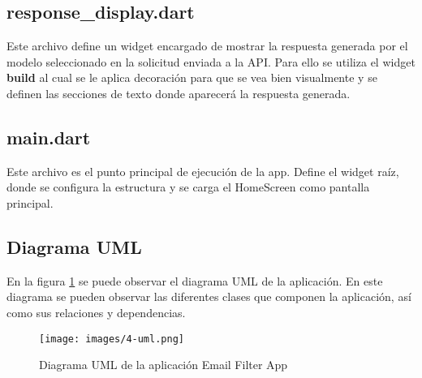 \documentclass[12pt]{article}
\begin{document}
\subsection{response\_display.dart}

Este archivo define un widget encargado de mostrar la respuesta generada por el modelo seleccionado en la solicitud enviada a la API. Para ello se utiliza el widget \textbf{build} al cual se le aplica decoración para que se vea bien visualmente y se definen las secciones de texto donde aparecerá la respuesta generada.

\subsection{main.dart}

Este archivo es el punto principal de ejecución de la app. Define el widget raíz, donde se configura la estructura y se carga el HomeScreen como pantalla principal.

\subsection{Diagrama UML}

En la figura \ref{fig:4-uml} se puede observar el diagrama UML de la aplicación. En este diagrama se pueden observar las diferentes clases que componen la aplicación, así como sus relaciones y dependencias.

\begin{figure}[H]
    \centering
    \texttt{[image: images/4-uml.png]}
    \caption{Diagrama UML de la aplicación Email Filter App}
    \label{fig:4-uml}
\end{figure}
\end{document}
